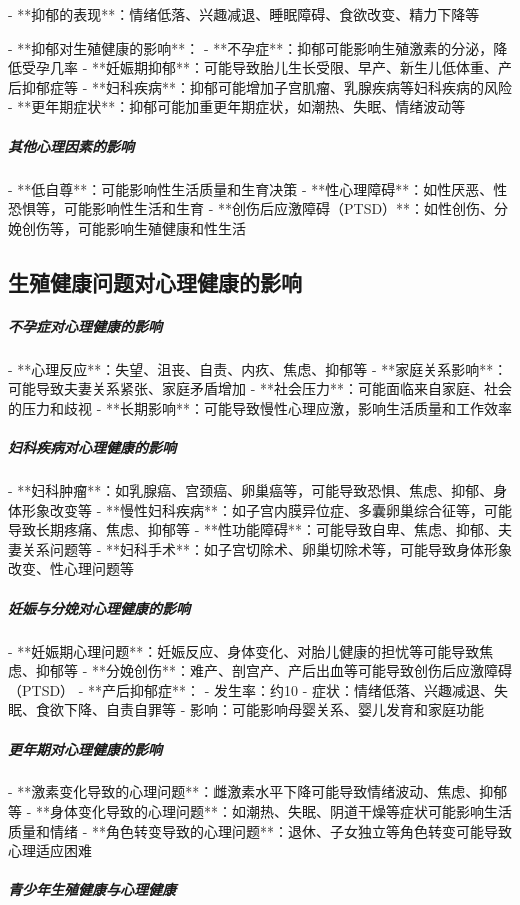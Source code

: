 \begin{enumerate}
- **抑郁的表现**：情绪低落、兴趣减退、睡眠障碍、食欲改变、精力下降等

- **抑郁对生殖健康的影响**：
  - **不孕症**：抑郁可能影响生殖激素的分泌，降低受孕几率
  - **妊娠期抑郁**：可能导致胎儿生长受限、早产、新生儿低体重、产后抑郁症等
  - **妇科疾病**：抑郁可能增加子宫肌瘤、乳腺疾病等妇科疾病的风险
  - **更年期症状**：抑郁可能加重更年期症状，如潮热、失眠、情绪波动等

\subparagraph{其他心理因素的影响}

- **低自尊**：可能影响性生活质量和生育决策
- **性心理障碍**：如性厌恶、性恐惧等，可能影响性生活和生育
- **创伤后应激障碍（PTSD）**：如性创伤、分娩创伤等，可能影响生殖健康和性生活

\subsection{生殖健康问题对心理健康的影响}

\subparagraph{不孕症对心理健康的影响}

- **心理反应**：失望、沮丧、自责、内疚、焦虑、抑郁等
- **家庭关系影响**：可能导致夫妻关系紧张、家庭矛盾增加
- **社会压力**：可能面临来自家庭、社会的压力和歧视
- **长期影响**：可能导致慢性心理应激，影响生活质量和工作效率

\subparagraph{妇科疾病对心理健康的影响}

- **妇科肿瘤**：如乳腺癌、宫颈癌、卵巢癌等，可能导致恐惧、焦虑、抑郁、身体形象改变等
- **慢性妇科疾病**：如子宫内膜异位症、多囊卵巢综合征等，可能导致长期疼痛、焦虑、抑郁等
- **性功能障碍**：可能导致自卑、焦虑、抑郁、夫妻关系问题等
- **妇科手术**：如子宫切除术、卵巢切除术等，可能导致身体形象改变、性心理问题等

\subparagraph{妊娠与分娩对心理健康的影响}

- **妊娠期心理问题**：妊娠反应、身体变化、对胎儿健康的担忧等可能导致焦虑、抑郁等
- **分娩创伤**：难产、剖宫产、产后出血等可能导致创伤后应激障碍（PTSD）
- **产后抑郁症**：
  - 发生率：约10%
  - 症状：情绪低落、兴趣减退、失眠、食欲下降、自责自罪等
  - 影响：可能影响母婴关系、婴儿发育和家庭功能

\subparagraph{更年期对心理健康的影响}

- **激素变化导致的心理问题**：雌激素水平下降可能导致情绪波动、焦虑、抑郁等
- **身体变化导致的心理问题**：如潮热、失眠、阴道干燥等症状可能影响生活质量和情绪
- **角色转变导致的心理问题**：退休、子女独立等角色转变可能导致心理适应困难

\subparagraph{青少年生殖健康与心理健康}


\end{enumerate}
